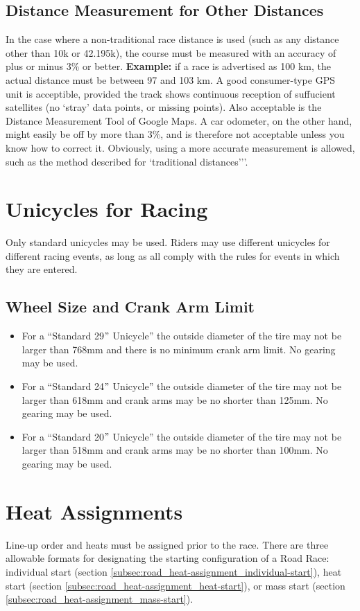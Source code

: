\subsection {Distance Measurement for Other Distances}
In the case where a non-traditional race distance is used (such as any distance other than 10k or 42.195k), the course must be measured with an accuracy of plus or minus 3\% or better.
\textbf{Example:} if a race is advertised as 100 km, the actual distance must be between 97 and 103 km.
A good consumer-type GPS unit is acceptible, provided the track shows continuous reception of suffucient satellites (no `stray' data points, or missing points).
Also acceptable is the Distance Measurement Tool of Google Maps.
A car odometer, on the other hand, might easily be off by more than 3\%, and is therefore not acceptable unless you know how to correct it.
Obviously, using a more accurate measurement is allowed, such as the method described for `traditional distances'’'.

\section{Unicycles for Racing}
Only standard unicycles may be used.
Riders may use different unicycles for different racing events, as long as all comply with the rules for events in which they are entered.
\subsection{Wheel Size and Crank Arm Limit}
\begin{itemize}
\item For a ``Standard 29$"$ Unicycle'' the outside diameter of the tire may not be larger than 768mm and there is no minimum crank arm limit.
No gearing may be used.
\item For a ``Standard 24$"$ Unicycle'' the outside diameter of the tire may not be larger than 618mm and crank arms may be no shorter than 125mm.
No gearing may be used.
\item For a ``Standard 20$"$ Unicycle'' the outside diameter of the tire may not be larger than 518mm and crank arms may be no shorter than 100mm.
No gearing may be used.
\end{itemize}

\section{Heat Assignments}
Line-up order and heats must be assigned prior to the race.
There are three allowable formats for designating the starting configuration of a Road Race: individual start (section \ref{subsec:road_heat-assignment_individual-start}), heat start (section \ref{subsec:road_heat-assignment_heat-start}), or mass start (section \ref{subsec:road_heat-assignment_mass-start}).

